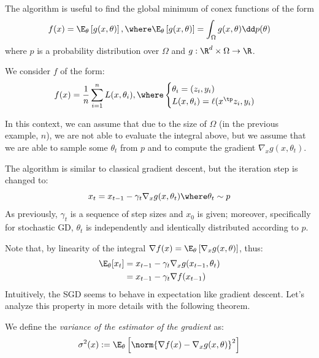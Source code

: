 \documentclass[toc, titlepaged]{../cs-classes/cs-classes}
\begin{document}
The algorithm is useful to find the global minimum of conex functions of the form
\begin{equation*}
    f(x)=\E_\theta\left[g(x, \theta)\right], \where \E_\theta\left[g(x, \theta)\right]=\int_\Omega g(x,\theta)\dd p(\theta)
\end{equation*}
where $p$ is a probability distribution over $\Omega$ and $g:\R^d\times\Omega\to\R$.

\begin{example}
    We consider $f$ of the form:
    \begin{equation*}
        f(x) = \frac{1}{n}\sum_{i=1}^n L(x, \theta_i), \where \begin{cases}
            \theta_i=(z_i, y_i)\\
            L(x, \theta_i)=\ell(x^\tp z_i, y_i)
        \end{cases}
    \end{equation*}
\end{example}
In this context, we can assume that due to the size of $\Omega$ (in the previous example, $n$), we are not able to evaluate the integral above, but we assume that we are able to sample some $\theta_t$ from $p$ and to compute the gradient $\nabla_x g(x, \theta_t)$.

The algorithm is similar to classical gradient descent, but the iteration step is changed to:
\begin{equation*}
    x_t=x_{t-1}-\gamma_t\nabla_x g(x, \theta_t) \where \theta_t\sim p
\end{equation*}
As previously, $\gamma_t$ is a sequence of step sizes and $x_0$ is given; moreover, specifically for stochastic GD, $\theta_t$ is independently and identically distributed according to $p$. 

Note that, by linearity of the integral $\nabla f(x)=\E_\theta\left[\nabla_x g(x,\theta)\right]$, thus:
\begin{equation*}
    \begin{aligned}
        \E_\theta[x_t] &= x_{t-1}-\gamma_t\nabla_xg(x_{t-1},\theta_t)\\
        &=x_{t-1} - \gamma_t\nabla f(x_{t-1})
    \end{aligned}
\end{equation*}
Intuitively, the SGD seems to behave in expectation like gradient descent. Let's analyze this property in more details with the following theorem.

\begin{definition}
    We define the \emph{variance of the estimator of the gradient} as:
    \begin{equation*}
        \sigma^2(x):=\E_\theta\left[\norm{\nabla f(x)-\nabla_x g(x,\theta)}^2\right]
    \end{equation*}
\end{definition}
\end{document}
